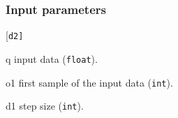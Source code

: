 \subsubsection*{Input parameters}
\begin{desclist}{\tt }{\quad}[\tt d2]
   \setlength\itemsep{0pt}
   \item[q]  input data (\texttt{float}). 
   \item[o1] first sample of the input data (\texttt{int}). 
   \item[d1] step size (\texttt{int}).  
\end{desclist}





